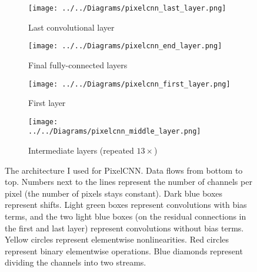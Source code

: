 \documentclass[11pt, a4paper, openany]{book}
\begin{document}
\begin{figure}
  \centering
    \begin{subfigure}{0.45\columnwidth}
    	\addtocounter{subfigure}{2}
        \centering
        \caption{Last convolutional layer}
        \texttt{[image: ../../Diagrams/pixelcnn\_last\_layer.png]} 
        \label{pixelcnn:last}
    \end{subfigure}
    \hfill
    \begin{subfigure}{0.45\columnwidth}
        \centering
        \caption{Final fully-connected layers}
        \texttt{[image: ../../Diagrams/pixelcnn\_end\_layer.png]} 
        \label{pixelcnn:end}
    \end{subfigure}
    \vspace{1cm}
    \addtocounter{subfigure}{-4}
    \begin{subfigure}{0.45\columnwidth}
        \centering
        \caption{First layer}
        \texttt{[image: ../../Diagrams/pixelcnn\_first\_layer.png]} 
        \label{pixelcnn:first}
    \end{subfigure}
    \hfill
    \begin{subfigure}{0.45\columnwidth}
        \centering
        \caption{Intermediate layers (repeated $13\times$)}
        \texttt{[image: ../../Diagrams/pixelcnn\_middle\_layer.png]} 
        \label{pixelcnn:middle}
    \end{subfigure}
  \caption[Architecture of PixelCNN]{The architecture I used for PixelCNN. Data flows from bottom to top. Numbers next to the lines represent the number of channels per pixel (the number of pixels stays constant). Dark blue boxes represent shifts. Light green boxes represent convolutions with bias terms, and the two light blue boxes (on the residual connections in the first and last layer) represent convolutions without bias terms. Yellow circles represent elementwise nonlinearities. Red circles represent binary elementwise operations. Blue diamonds represent dividing the channels into two streams.}
  \label{pixelcnn}
\end{figure}
\end{document}
